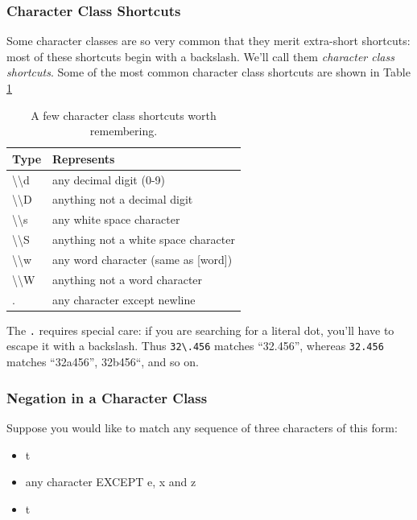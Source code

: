 \documentclass[]{book}
\providecommand{\tightlist}{%
  \setlength{\itemsep}{0pt}\setlength{\parskip}{0pt}}
\theoremstyle{definition}
\theoremstyle{definition}
\theoremstyle{definition}
\theoremstyle{remark}
\begin{document}
{\subsubsection{Character Class
Shortcuts}\label{character-class-shortcuts}

Some character classes are so very common that they merit extra-short
shortcuts: most of these shortcuts begin with a backslash. We'll call
them \emph{character class shortcuts}. 
Some of the most common character class shortcuts are shown in Table
\ref{tab:character-types}

\begin{table}

\caption{\label{tab:character-types}A few character class shortcuts worth remembering.}
\centering
\begin{tabular}[t]{l|l}
\hline
Type & Represents\\
\hline
\textbackslash{}\textbackslash{}d & any decimal digit (0-9)\\
\hline
\textbackslash{}\textbackslash{}D & anything not a decimal digit\\
\hline
\textbackslash{}\textbackslash{}s & any white space character\\
\hline
\textbackslash{}\textbackslash{}S & anything not a white space character\\
\hline
\textbackslash{}\textbackslash{}w & any word character (same as [word])\\
\hline
\textbackslash{}\textbackslash{}W & anything not a word character\\
\hline
. & any character except newline\\
\hline
\end{tabular}
\end{table}

The \texttt{.} requires special care: if you are searching for a literal
dot, you'll have to escape it with a backslash. Thus
\texttt{32\textbackslash{}.456} matches ``32.456'', whereas
\texttt{32.456} matches ``32a456'', 32b456``, and so on.

\subsubsection{Negation in a Character
Class}\label{negation-in-a-character-class}

Suppose you would like to match any sequence of three characters of this
form:

\begin{itemize}
\tightlist
\item
  t
\item
  any character EXCEPT e, x and z
\item
  t
\end{itemize}

}
\end{document}
